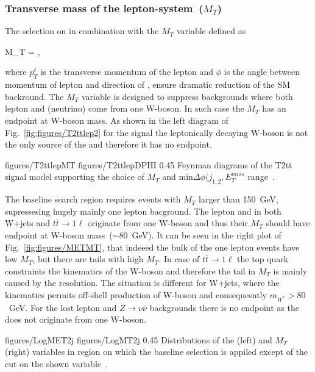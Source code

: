 \subsubsection{Transverse mass of the lepton-\MET system~($M_{T}$)}

The selection on \MET in combination with the $M_{T}$ variable defined as

{
 M_{T} =  ,
}

where $p_{T}^{\ell}$ is the transverse momentum of the lepton and $\phi$ is the angle between momentum of lepton and direction of \MET, ensure dramatic reduction of the SM backround. The $M_{T}$ variable is  designed to suppress backgrounds where both lepton and \MET (neutrino) come from one W-boson. In such case the $M_{T}$ has an endpoint at W-boson mass. As shown in the left diagram of Fig.~\ref{fig:figures/T2ttlep2} for the signal the leptonically decaying W-boson is not the only source of the \MET and therefore it has no endpoint.

                 {figures/T2ttlepMT} %
                 {figures/T2ttlepDPHI} %
                 {0.45}       %
                 { Feynman diagrams of the T2tt signal model supporting the choice of $M_{T}$ and min$\Delta \phi (j_{1,2}, E_{T}^{miss}$ range~\cite{CMS:2016vew}. }

The baseline search region requires events with $M_{T}$ larger than 150~GeV, supressesing hugely mainly one lepton bacground. The lepton and \MET in both  W+jets and $t \bar{t} \to 1\ell$ originate from one W-boson and thus their $M_{T}$ should have endpoint at W-boson mass~($\sim$80~GeV). It can be seen in the right plot of Fig.~\ref{fig:figures/METMT}, that indeeed the bulk of the one lepton events have low $M_{T}$, but there are tails with high $M_{T}$. In case of $t \bar{t} \to 1\ell$ the top quark constraints the kinematics of the W-boson and therefore the tail in $M_{T}$  is mainly caused by the \MET resolution. The situation is different for W+jets, where the kinematics permits off-shell production of W-boson and consequesntly $m_{W^{*}}> 80$~GeV. For the lost lepton and $Z \to \nu \bar{\nu}$ backgrounds there is no endpoint as the \MET does not originate from one W-boson.

                 {figures/LogMET2j} %
                 {figures/LogMT2j} %
                 {0.45}       %
                 { Distributions of the \MET (left) and $M_{T}$ (right) variables in region on which the baseline selection is appiled except of the cut on the shown variable~\cite{website:stopSupp}. }

